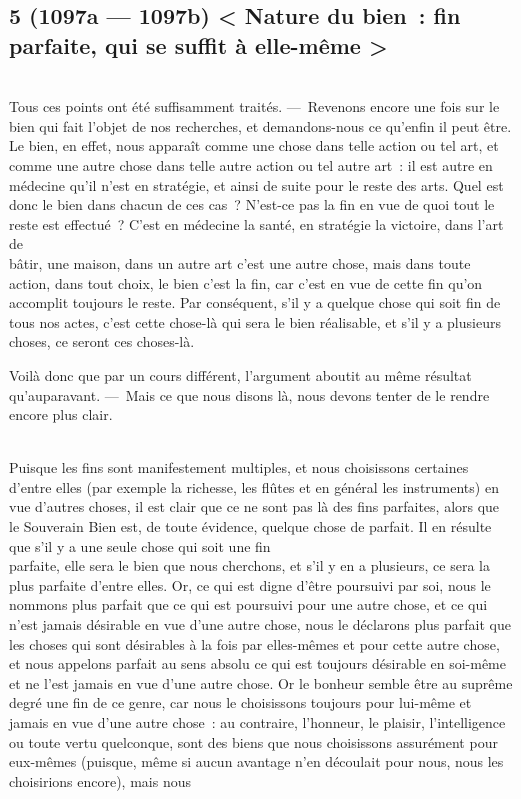 \documentclass[french,twoside]{book} %
\begin{document}
\subsection[{5 (1097a — 1097b) < Nature du bien : fin parfaite, qui se suffit à elle-même >}]{5 (1097a — 1097b) < Nature du bien : fin parfaite, qui se suffit à elle-même >}
\noindent \\
Tous ces points ont été suffisamment traités. — Revenons encore une fois sur le bien qui fait l’objet de nos recherches, et demandons-nous ce qu’enfin il peut être. Le bien, en effet, nous apparaît comme une chose dans telle action ou tel art, et comme une autre chose dans telle autre action ou tel autre art : il est autre en médecine qu’il n’est en stratégie, et ainsi de suite pour le reste des arts. Quel est donc le bien dans chacun de ces cas ? N’est-ce pas la fin en vue de quoi tout le reste est effectué ? C’est en médecine la santé, en stratégie la victoire, dans l’art de \\
bâtir, une maison, dans un autre art c’est une autre chose, mais dans toute action, dans tout choix, le bien c’est la fin, car c’est en vue de cette fin qu’on accomplit toujours le reste. Par conséquent, s’il y a quelque chose qui soit fin de tous nos actes, c’est cette chose-là qui sera le bien réalisable, et s’il y a plusieurs choses, ce seront ces choses-là.\par
Voilà donc que par un cours différent, l’argument aboutit au même résultat qu’auparavant. — Mais ce que nous disons là, nous devons tenter de le rendre encore plus clair.\par
\\
Puisque les fins sont manifestement multiples, et nous choisissons certaines d’entre elles (par exemple la richesse, les flûtes et en général les instruments) en vue d’autres choses, il est clair que ce ne sont pas là des fins parfaites, alors que le Souverain Bien est, de toute évidence, quelque chose de parfait. Il en résulte que s’il y a une seule chose qui soit une fin \\
parfaite, elle sera le bien que nous cherchons, et s’il y en a plusieurs, ce sera la plus parfaite d’entre elles. Or, ce qui est digne d’être poursuivi par soi, nous le nommons plus parfait que ce qui est poursuivi pour une autre chose, et ce qui n’est jamais désirable en vue d’une autre chose, nous le déclarons plus parfait que les choses qui sont désirables à la fois par elles-mêmes et pour cette autre chose, et nous appelons parfait au sens absolu ce qui est toujours désirable en soi-même et ne l’est jamais en vue d’une autre chose. Or le bonheur semble être au  suprême degré une fin de ce genre, car nous le choisissons toujours pour lui-même et jamais en vue d’une autre chose : au contraire, l’honneur, le plaisir, l’intelligence ou toute vertu quelconque, sont des biens que nous choisissons assurément pour eux-mêmes (puisque, même si aucun avantage n’en découlait pour nous, nous les choisirions encore), mais nous \\
\end{document}
